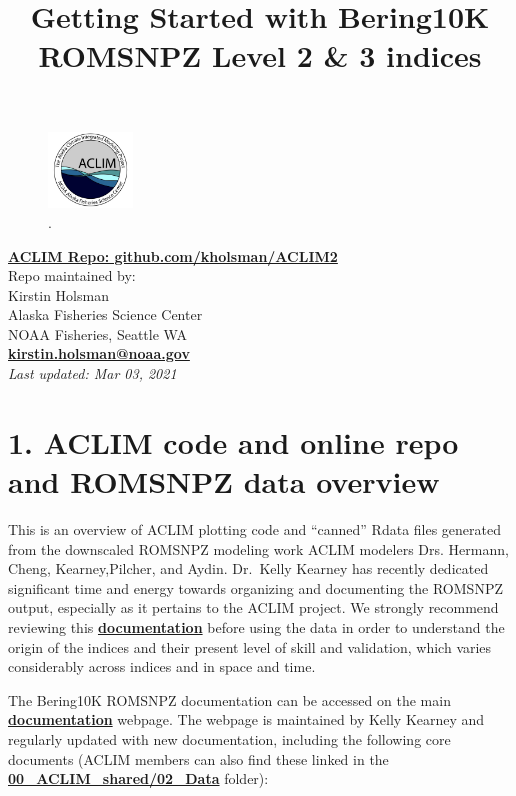 \documentclass[
]{article}
\title{Getting Started with Bering10K ROMSNPZ Level 2 \& 3 indices}
\author{}
\date{\vspace{-2.5em}}
\begin{document}
\maketitle

{
\setcounter{tocdepth}{2}
\tableofcontents
}
\begin{figure}
\centering
\includegraphics[width=0.2\textwidth,height=\textheight]{Figs/ACLIM_logo.jpg}
\caption{.}
\end{figure}

\href{https://github.com/kholsman/ACLIM2}{\textbf{ACLIM Repo:
github.com/kholsman/ACLIM2}}\\
Repo maintained by:\\
Kirstin Holsman\\
Alaska Fisheries Science Center\\
NOAA Fisheries, Seattle WA\\
\textbf{\url{kirstin.holsman@noaa.gov}}~\\
\emph{Last updated: Mar 03, 2021}

\hypertarget{aclim-code-and-online-repo-and-romsnpz-data-overview}{%
\section{1. ACLIM code and online repo and ROMSNPZ data
overview}\label{aclim-code-and-online-repo-and-romsnpz-data-overview}}

This is an overview of ACLIM plotting code and ``canned'' Rdata files
generated from the downscaled ROMSNPZ modeling work ACLIM modelers Drs.
Hermann, Cheng, Kearney,Pilcher, and Aydin. Dr.~Kelly Kearney has
recently dedicated significant time and energy towards organizing and
documenting the ROMSNPZ output, especially as it pertains to the ACLIM
project. We strongly recommend reviewing this
\href{https://beringnpz.github.io/roms-bering-sea/B10K-dataset-docs/}{\textbf{documentation}}
before using the data in order to understand the origin of the indices
and their present level of skill and validation, which varies
considerably across indices and in space and time.

The Bering10K ROMSNPZ documentation can be accessed on the main
\href{https://beringnpz.github.io/roms-bering-sea/B10K-dataset-docs/}{\textbf{documentation}}
webpage. The webpage is maintained by Kelly Kearney and regularly
updated with new documentation, including the following core documents
(ACLIM members can also find these linked in the
\href{https://drive.google.com/drive/u/0/folders/0Bx7wdZllbuF9eDJndkhCS2EwQUk}{\textbf{00\_ACLIM\_shared/02\_Data}}
folder):
\end{document}
